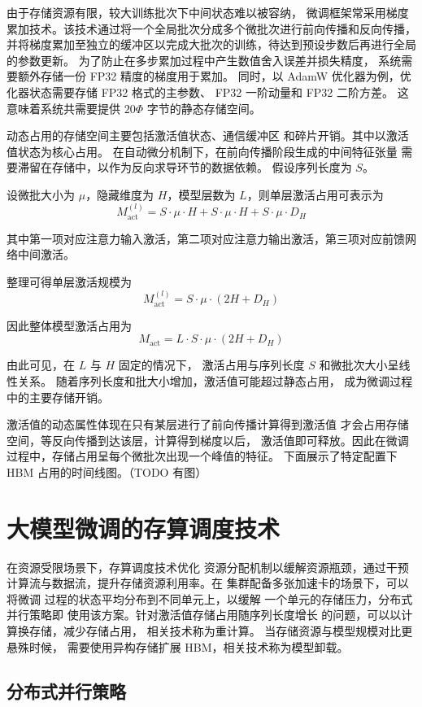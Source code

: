 \documentclass[bachelor,openany,oneside,color,AutoFakeBold=true]{buaathesis}
\begin{document}
由于存储资源有限，较大训练批次下中间状态难以被容纳，
微调框架常采用梯度累加技术。该技术通过将一个全局批次分成多个微批次进行前向传播和反向传播，
并将梯度累加至独立的缓冲区以完成大批次的训练，待达到预设步数后再进行全局的参数更新。
为了防止在多步累加过程中产生数值舍入误差并损失精度，
系统需要额外存储一份 FP32 精度的梯度用于累加。
同时，以 AdamW 优化器为例，优化器状态需要存储 FP32 格式的主参数、
FP32 一阶动量和 FP32 二阶方差。
这意味着系统共需要提供 $20\Phi$ 字节的静态存储空间。

动态占用的存储空间主要包括激活值状态、通信缓冲区
和碎片开销。其中以激活值状态为核心占用。
在自动微分机制下，在前向传播阶段生成的中间特征张量
需要滞留在存储中，以作为反向求导环节的数据依赖。
假设序列长度为 $S$。

设微批大小为 ${\mu}$，隐藏维度为 $H$，模型层数为 $L$，则单层激活占用可表示为
\[
M_{\mathrm{act}}^{(l)} = S \cdot \mu \cdot H + S \cdot \mu \cdot H + S \cdot \mu \cdot D_H
\]

其中第一项对应注意力输入激活，第二项对应注意力输出激活，第三项对应前馈网络中间激活。

整理可得单层激活规模为
\[
M_{\mathrm{act}}^{(l)} = S \cdot \mu \cdot (2H + D_H)
\]

因此整体模型激活占用为
\[
M_{\mathrm{act}} = L \cdot S \cdot \mu \cdot (2H + D_H)
\]

由此可见，在 $L$ 与 $H$ 固定的情况下，
激活占用与序列长度 $S$ 和微批次大小呈线性关系。
随着序列长度和批大小增加，激活值可能超过静态占用，
成为微调过程中的主要存储开销。

激活值的动态属性体现在只有某层进行了前向传播计算得到激活值
才会占用存储空间，等反向传播到达该层，计算得到梯度以后，
激活值即可释放。因此在微调过程中，存储占用呈每个微批次出现一个峰值的特征。
下面展示了特定配置下 HBM 占用的时间线图。（TODO 有图）

\section{大模型微调的存算调度技术}

在资源受限场景下，存算调度技术优化
资源分配机制以缓解资源瓶颈，通过干预
计算流与数据流，提升存储资源利用率。在
集群配备多张加速卡的场景下，可以将微调
过程的状态平均分布到不同单元上，以缓解
一个单元的存储压力，分布式并行策略即
使用该方案。针对激活值存储占用随序列长度增长
的问题，可以以计算换存储，减少存储占用，
相关技术称为重计算。
当存储资源与模型规模对比更悬殊时候，
需要使用异构存储扩展 HBM，相关技术称为模型卸载。

\subsection{分布式并行策略}
\end{document}
